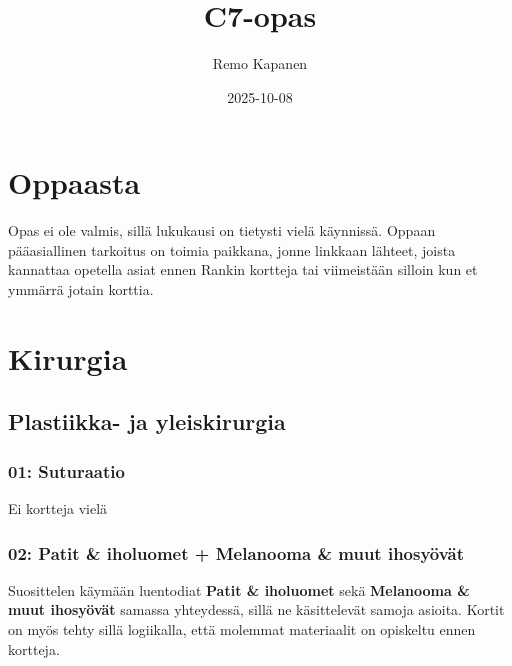 \documentclass[
]{book}
\title{C7-opas}
\author{Remo Kapanen}
\date{2025-10-08}
\begin{document}
\maketitle

{
\setcounter{tocdepth}{1}
\tableofcontents
}
\chapter{Oppaasta}\label{oppaasta}

Opas ei ole valmis, sillä lukukausi on tietysti vielä käynnissä. Oppaan pääasiallinen tarkoitus on toimia paikkana, jonne linkkaan lähteet, joista kannattaa opetella asiat ennen Rankin kortteja tai viimeistään silloin kun et ymmärrä jotain korttia.

\chapter{Kirurgia}\label{kirurgia}

\section{Plastiikka- ja yleiskirurgia}\label{plastiikka--ja-yleiskirurgia}

\subsection{01: Suturaatio}\label{suturaatio}

Ei kortteja vielä

\subsection{02: Patit \& iholuomet + Melanooma \& muut ihosyövät}\label{Ihosyovat}

Suosittelen käymään luentodiat \textbf{Patit \& iholuomet} sekä \textbf{Melanooma \& muut ihosyövät} samassa yhteydessä, sillä ne käsittelevät samoja asioita. Kortit on myös tehty sillä logiikalla, että molemmat materiaalit on opiskeltu ennen kortteja.
\end{document}
